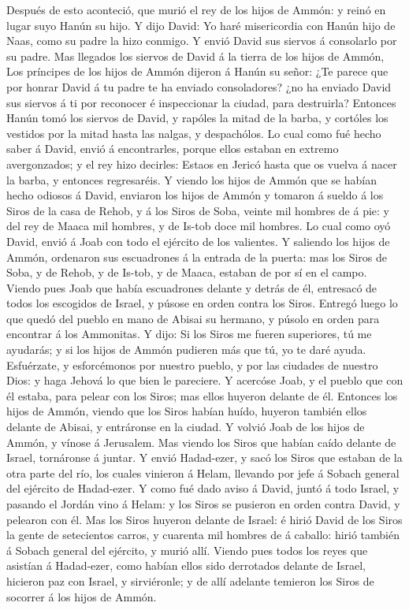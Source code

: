  Después de esto aconteció, que murió el rey de los hijos de
Ammón: y reinó en lugar suyo Hanún su hijo.  Y dijo David:
Yo haré misericordia con Hanún hijo de Naas, como su padre la hizo
conmigo. Y envió David sus siervos á consolarlo por su padre. Mas
llegados los siervos de David á la tierra de los hijos de Ammón,
 Los príncipes de los hijos de Ammón dijeron á Hanún su
señor: ¿Te parece que por honrar David á tu padre te ha enviado
consoladores? ¿no ha enviado David sus siervos á ti por reconocer é
inspeccionar la ciudad, para destruirla?  Entonces Hanún
tomó los siervos de David, y rapóles la mitad de la barba, y cortóles
los vestidos por la mitad hasta las nalgas, y despachólos. 
Lo cual como fué hecho saber á David, envió á encontrarles, porque ellos
estaban en extremo avergonzados; y el rey hizo decirles: Estaos en
Jericó hasta que os vuelva á nacer la barba, y entonces regresaréis.
 Y viendo los hijos de Ammón que se habían hecho odiosos á
David, enviaron los hijos de Ammón y tomaron á sueldo á los Siros de la
casa de Rehob, y á los Siros de Soba, veinte mil hombres de á pie: y del
rey de Maaca mil hombres, y de Is-tob doce mil hombres.  Lo
cual como oyó David, envió á Joab con todo el ejército de los valientes.
 Y saliendo los hijos de Ammón, ordenaron sus escuadrones á
la entrada de la puerta: mas los Siros de Soba, y de Rehob, y de Is-tob,
y de Maaca, estaban de por sí en el campo.  Viendo pues Joab
que había escuadrones delante y detrás de él, entresacó de todos los
escogidos de Israel, y púsose en orden contra los Siros. 
Entregó luego lo que quedó del pueblo en mano de Abisai su hermano, y
púsolo en orden para encontrar á los Ammonitas.  Y dijo: Si
los Siros me fueren superiores, tú me ayudarás; y si los hijos de Ammón
pudieren más que tú, yo te daré ayuda.  Esfuérzate, y
esforcémonos por nuestro pueblo, y por las ciudades de nuestro Dios: y
haga Jehová lo que bien le pareciere.  Y acercóse Joab, y
el pueblo que con él estaba, para pelear con los Siros; mas ellos
huyeron delante de él.  Entonces los hijos de Ammón, viendo
que los Siros habían huído, huyeron también ellos delante de Abisai, y
entráronse en la ciudad. Y volvió Joab de los hijos de Ammón, y vínose á
Jerusalem.  Mas viendo los Siros que habían caído delante
de Israel, tornáronse á juntar.  Y envió Hadad-ezer, y sacó
los Siros que estaban de la otra parte del río, los cuales vinieron á
Helam, llevando por jefe á Sobach general del ejército de Hadad-ezer.
 Y como fué dado aviso á David, juntó á todo Israel, y
pasando el Jordán vino á Helam: y los Siros se pusieron en orden contra
David, y pelearon con él.  Mas los Siros huyeron delante de
Israel: é hirió David de los Siros la gente de setecientos carros, y
cuarenta mil hombres de á caballo: hirió también á Sobach general del
ejército, y murió allí.  Viendo pues todos los reyes que
asistían á Hadad-ezer, como habían ellos sido derrotados delante de
Israel, hicieron paz con Israel, y sirviéronle; y de allí adelante
temieron los Siros de socorrer á los hijos de Ammón.

